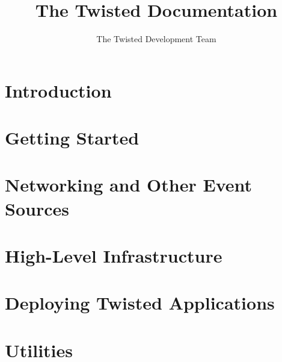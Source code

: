 \documentclass[oneside]{book}
\title{The Twisted Documentation}
\author{The Twisted Development Team}
\begin{document}
\maketitle
\tableofcontents

\chapter{Introduction}




\chapter{Getting Started}




















\chapter{Networking and Other Event Sources}














\chapter{High-Level Infrastructure}







\chapter{Deploying Twisted Applications}






\chapter{Utilities}
\end{document}
